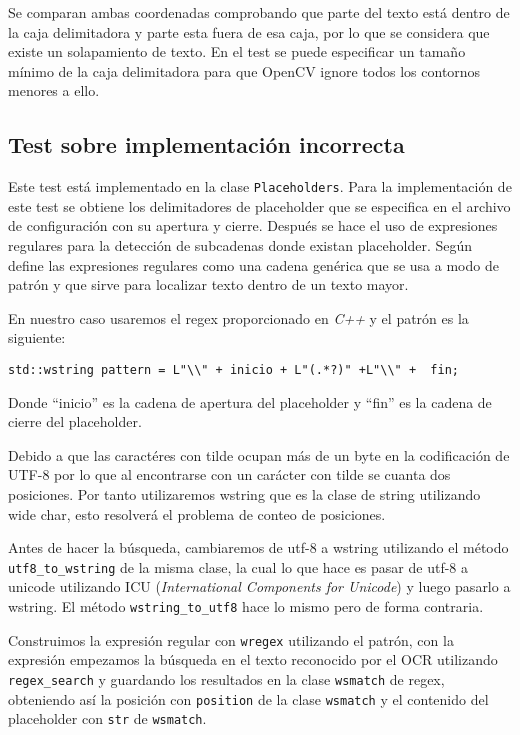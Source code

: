 Se comparan ambas coordenadas comprobando que parte del texto está dentro de la caja delimitadora y parte esta fuera de esa caja, por lo que se considera que existe un solapamiento de texto. En el test se puede especificar un tamaño mínimo de la caja delimitadora para que OpenCV ignore todos los contornos menores a ello. 
\subsection{Test sobre implementación incorrecta}
\label{itest:placeholder}
Este test está implementado en la clase \texttt{Placeholders}.
Para la implementación de este test se obtiene los delimitadores de placeholder que se especifica en el archivo de configuración con su apertura y cierre. Después se hace el uso de expresiones regulares para la detección de subcadenas donde existan placeholder. Según \cite{Regex} define las expresiones regulares como una cadena genérica que se usa a modo de patrón y que sirve para localizar texto dentro de un texto mayor. 

En nuestro caso usaremos el regex proporcionado en \emph{C++} y el patrón es la siguiente:

\verb|std::wstring pattern = L"\\" + inicio + L"(.*?)" +L"\\" +  fin;|

Donde ``inicio'' es la cadena de apertura del placeholder y ``fin'' es la cadena de cierre del placeholder. 

Debido a que las caractéres con tilde ocupan más de un byte en la codificación de UTF-8 por lo que al encontrarse con un carácter con tilde se cuanta dos posiciones. Por tanto utilizaremos wstring que es la clase de string utilizando wide char, esto resolverá el problema de conteo de posiciones.

Antes de hacer la búsqueda, cambiaremos de utf-8 a wstring utilizando el método \texttt{utf8\_to\_wstring} de la misma clase, la cual lo que hace es pasar de utf-8 a unicode utilizando ICU (\textit{International Components for Unicode}) y luego pasarlo a wstring. El método \texttt{wstring\_to\_utf8} hace lo mismo pero de forma contraria.

Construimos la expresión regular con \texttt{wregex} utilizando el patrón, con la expresión empezamos la búsqueda en el texto reconocido por el OCR utilizando \texttt{regex\_search} y guardando los resultados en la clase \texttt{wsmatch} de regex, obteniendo así la posición con \texttt{position} de la clase \texttt{wsmatch} y el contenido del placeholder con \texttt{str} de \texttt{wsmatch}.


